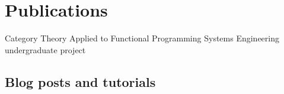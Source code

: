 \documentclass[letterpaper,sans,12pt]{moderncv}
\begin{document}
\section{Publications}

  {Category Theory Applied to Functional Programming}
  {Systems Engineering undergraduate project}
  {}
  {}
  {
  }

\subsection{Blog posts and tutorials}
\end{document}
